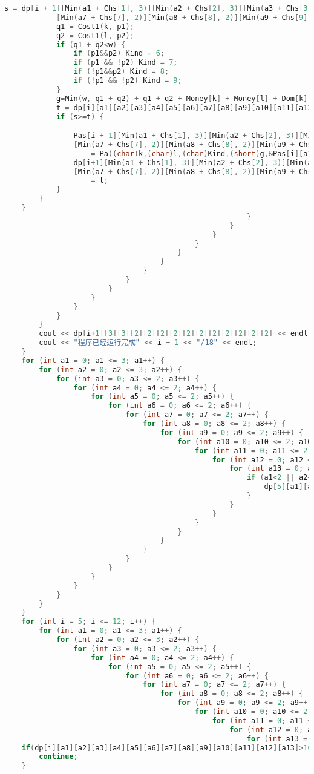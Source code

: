\begin{lstlisting}[language=C++, numberstyle={\color{black!33}\tiny\sffamily}, basicstyle=\tiny]
			s = dp[i + 1][Min(a1 + Chs[1], 3)][Min(a2 + Chs[2], 3)][Min(a3 + Chs[3], 2)][Min(a4 + Chs[4], 2)][Min(a5 + Chs[5], 2)][Min(a6 + Chs[6], 2)]
			[Min(a7 + Chs[7], 2)][Min(a8 + Chs[8], 2)][Min(a9 + Chs[9], 2)][Min(a10 + Chs[10], 2)][Min(a11 + Chs[11], 2)][Min(a12 + Chs[12], 2)][Min(a13 + Chs[13], 2)];
			q1 = Cost1(k, p1);
			q2 = Cost1(l, p2);
			if (q1 + q2<w) {
				if (p1&&p2) Kind = 6;
				if (p1 && !p2) Kind = 7;
				if (!p1&&p2) Kind = 8;
				if (!p1 && !p2) Kind = 9;
			}
			g=Min(w, q1 + q2) + q1 + q2 + Money[k] + Money[l] + Dom[k] * (Nodes[k].End - Nodes[k].Beg) + Dom[l] * (Nodes[l].End - Nodes[l].Beg);
			t = dp[i][a1][a2][a3][a4][a5][a6][a7][a8][a9][a10][a11][a12][a13] + g;
			if (s>=t) {

				Pas[i + 1][Min(a1 + Chs[1], 3)][Min(a2 + Chs[2], 3)][Min(a3 + Chs[3], 2)][Min(a4 + Chs[4], 2)][Min(a5 + Chs[5], 2)][Min(a6 + Chs[6], 2)]
				[Min(a7 + Chs[7], 2)][Min(a8 + Chs[8], 2)][Min(a9 + Chs[9], 2)][Min(a10 + Chs[10], 2)][Min(a11 + Chs[11], 2)][Min(a12 + Chs[12], 2)][Min(a13 + Chs[13], 2)]
					= Pa((char)k,(char)l,(char)Kind,(short)g,&Pas[i][a1][a2][a3][a4][a5][a6][a7][a8][a9][a10][a11][a12][a13]);
				dp[i+1][Min(a1 + Chs[1], 3)][Min(a2 + Chs[2], 3)][Min(a3 + Chs[3], 2)][Min(a4 + Chs[4], 2)][Min(a5 + Chs[5], 2)][Min(a6 + Chs[6], 2)]
				[Min(a7 + Chs[7], 2)][Min(a8 + Chs[8], 2)][Min(a9 + Chs[9], 2)][Min(a10 + Chs[10], 2)][Min(a11 + Chs[11], 2)][Min(a12 + Chs[12], 2)][Min(a13 + Chs[13], 2)]
					= t;
			}
		}
	}
														}
													}
												}
											}
										}
									}
								}
							}
						}
					}
				}
			}
		}
		cout << dp[i+1][3][3][2][2][2][2][2][2][2][2][2][2][2] << endl;
		cout << "程序已经运行完成" << i + 1 << "/18" << endl;
	}
	for (int a1 = 0; a1 <= 3; a1++) {
		for (int a2 = 0; a2 <= 3; a2++) {
			for (int a3 = 0; a3 <= 2; a3++) {
				for (int a4 = 0; a4 <= 2; a4++) {
					for (int a5 = 0; a5 <= 2; a5++) {
						for (int a6 = 0; a6 <= 2; a6++) {
							for (int a7 = 0; a7 <= 2; a7++) {
								for (int a8 = 0; a8 <= 2; a8++) {
									for (int a9 = 0; a9 <= 2; a9++) {
										for (int a10 = 0; a10 <= 2; a10++) {
											for (int a11 = 0; a11 <= 2; a11++) {
												for (int a12 = 0; a12 <= 2; a12++) {
													for (int a13 = 0; a13 <= 2; a13++) {
														if (a1<2 || a2<1 || a12<1 || a13<1) {
															dp[5][a1][a2][a3][a4][a5][a6][a7][a8][a9][a10][a11][a12][a13] = INF;
														}
													}
												}
											}
										}
									}
								}
							}
						}
					}
				}
			}
		}
	}
	for (int i = 5; i <= 12; i++) {
		for (int a1 = 0; a1 <= 3; a1++) {
			for (int a2 = 0; a2 <= 3; a2++) {
				for (int a3 = 0; a3 <= 2; a3++) {
					for (int a4 = 0; a4 <= 2; a4++) {
						for (int a5 = 0; a5 <= 2; a5++) {
							for (int a6 = 0; a6 <= 2; a6++) {
								for (int a7 = 0; a7 <= 2; a7++) {
									for (int a8 = 0; a8 <= 2; a8++) {
										for (int a9 = 0; a9 <= 2; a9++) {
											for (int a10 = 0; a10 <= 2; a10++) {
												for (int a11 = 0; a11 <= 2; a11++) {
													for (int a12 = 0; a12 <= 2; a12++) {
														for (int a13 = 0; a13 <= 2; a13++) {
	if(dp[i][a1][a2][a3][a4][a5][a6][a7][a8][a9][a10][a11][a12][a13]>1000000){
	 	continue;
    }


\end{lstlisting}
